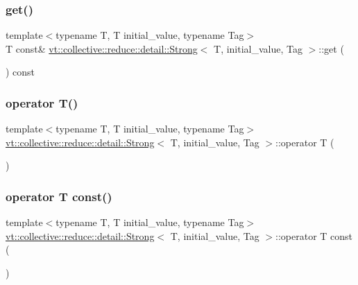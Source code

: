 \subsubsection{\texorpdfstring{get()}{get()}\hspace{0.1cm}{\footnotesize\ttfamily [2/2]}}
{\footnotesize\ttfamily template$<$typename T, T initial\+\_\+value, typename Tag$>$ \\
T const\& \hyperlink{structvt_1_1collective_1_1reduce_1_1detail_1_1_strong}{vt\+::collective\+::reduce\+::detail\+::\+Strong}$<$ T, initial\+\_\+value, Tag $>$\+::get (\begin{DoxyParamCaption}{ }\end{DoxyParamCaption}) const\hspace{0.3cm}{\ttfamily [inline]}}

\mbox{\label{structvt_1_1collective_1_1reduce_1_1detail_1_1_strong_a6390ad9dc68266d649493d5bcf83dc42}} 
\subsubsection{\texorpdfstring{operator T()}{operator T()}}
{\footnotesize\ttfamily template$<$typename T, T initial\+\_\+value, typename Tag$>$ \\
\hyperlink{structvt_1_1collective_1_1reduce_1_1detail_1_1_strong}{vt\+::collective\+::reduce\+::detail\+::\+Strong}$<$ T, initial\+\_\+value, Tag $>$\+::operator T (\begin{DoxyParamCaption}{ }\end{DoxyParamCaption})\hspace{0.3cm}{\ttfamily [inline]}}

\mbox{\label{structvt_1_1collective_1_1reduce_1_1detail_1_1_strong_a641850befb357381a38c66486a27f14f}} 
\subsubsection{\texorpdfstring{operator T const()}{operator T const()}}
{\footnotesize\ttfamily template$<$typename T, T initial\+\_\+value, typename Tag$>$ \\
\hyperlink{structvt_1_1collective_1_1reduce_1_1detail_1_1_strong}{vt\+::collective\+::reduce\+::detail\+::\+Strong}$<$ T, initial\+\_\+value, Tag $>$\+::operator T const (\begin{DoxyParamCaption}{ }\end{DoxyParamCaption})\hspace{0.3cm}{\ttfamily [inline]}}

